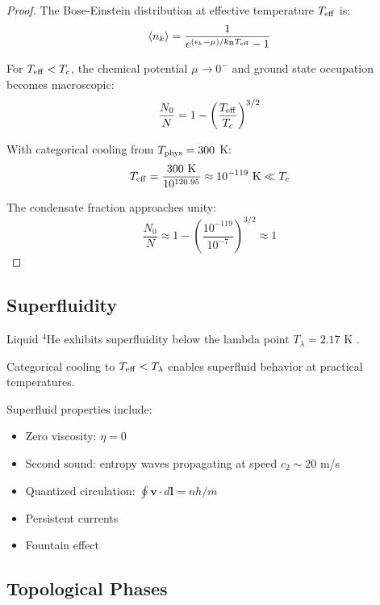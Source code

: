 \begin{proof}
The Bose-Einstein distribution at effective temperature $T_{\mathrm{eff}}$ is:
\begin{equation}
\langle n_k \rangle = \frac{1}{e^{(\epsilon_k - \mu)/k_{\mathrm{B}} T_{\mathrm{eff}}} - 1}
\end{equation}

For $T_{\mathrm{eff}} < T_c$, the chemical potential $\mu \to 0^-$ and ground state occupation becomes macroscopic:
\begin{equation}
\frac{N_0}{N} = 1 - \left(\frac{T_{\mathrm{eff}}}{T_c}\right)^{3/2}
\end{equation}

With categorical cooling from $T_{\mathrm{phys}} = 300$ K:
\begin{equation}
T_{\mathrm{eff}} = \frac{300 \text{ K}}{10^{120.95}} \approx 10^{-119} \text{ K} \ll T_c
\end{equation}

The condensate fraction approaches unity:
\begin{equation}
\frac{N_0}{N} \approx 1 - \left(\frac{10^{-119}}{10^{-7}}\right)^{3/2} \approx 1
\end{equation}
\end{proof}

\subsection{Superfluidity}

Liquid $^4$He exhibits superfluidity below the lambda point $T_\lambda = 2.17$ K \cite{kapitza1938,allen1938}.

\begin{theorem}
\label{thm:superfluidity}
Categorical cooling to $T_{\mathrm{eff}} < T_\lambda$ enables superfluid behavior at practical temperatures.
\end{theorem}

Superfluid properties include:
\begin{itemize}
    \item Zero viscosity: $\eta = 0$
    \item Second sound: entropy waves propagating at speed $c_2 \sim 20$ m/s
    \item Quantized circulation: $\oint \mathbf{v} \cdot d\mathbf{l} = nh/m$
    \item Persistent currents
    \item Fountain effect
\end{itemize}

\subsection{Topological Phases}

